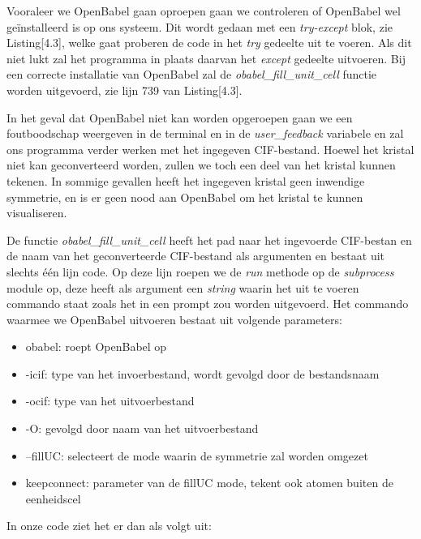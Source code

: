 

Vooraleer we OpenBabel gaan oproepen gaan we controleren of OpenBabel wel geïnstalleerd is op ons systeem. Dit wordt gedaan met een \textit{try-except} blok, zie Listing[4.3], welke gaat proberen de code in het \textit{try} gedeelte uit te voeren. Als dit niet lukt zal het programma in plaats daarvan het \textit{except} gedeelte uitvoeren. Bij een correcte installatie van OpenBabel zal de \textit{obabel\_fill\_unit\_cell} functie worden uitgevoerd, zie lijn 739 van Listing[4.3].
\par
In het geval dat OpenBabel niet kan worden opgeroepen gaan we een foutboodschap weergeven in de terminal en in de \textit{user\_feedback} variabele en zal ons programma verder werken met het ingegeven CIF-bestand. Hoewel het kristal niet kan geconverteerd worden, zullen we toch een deel van het kristal kunnen tekenen. In sommige gevallen heeft het ingegeven kristal geen inwendige symmetrie, en is er geen nood aan OpenBabel om het kristal te kunnen visualiseren.


\par	
De functie \textit{obabel\_fill\_unit\_cell} heeft het pad naar het ingevoerde CIF-bestan en de naam van het geconverteerde CIF-bestand als argumenten en bestaat uit slechts één lijn code. Op deze lijn roepen we de \textit{run} methode op de \textit{subprocess} module op, deze heeft als argument een \textit{string} waarin het uit te voeren commando staat zoals het in een prompt zou worden uitgevoerd. Het commando waarmee we OpenBabel uitvoeren bestaat uit volgende parameters:
\begin{itemize}
\item obabel: roept OpenBabel op
\item -icif: type van het invoerbestand, wordt gevolgd door de bestandsnaam
\item -ocif: type van het uitvoerbestand
\item -O: gevolgd door naam van het uitvoerbestand
\item --fillUC: selecteert de mode waarin de symmetrie zal worden omgezet
\item keepconnect: parameter van de fillUC mode, tekent ook atomen buiten de eenheidscel
\end{itemize}
In onze code ziet het er dan als volgt uit:


